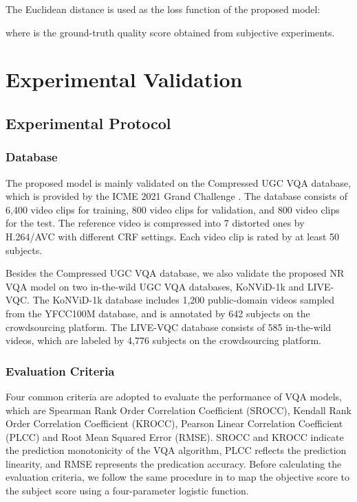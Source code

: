 \documentclass{article}
\begin{document}
The Euclidean distance is used as the loss function of the proposed model:

where  is the ground-truth quality score obtained from subjective experiments.

\section{Experimental Validation}


\subsection{Experimental Protocol}
\subsubsection{Database}
The proposed model is mainly validated on the Compressed UGC VQA database, which is provided by the ICME 2021 Grand Challenge \cite{ugc2021challenge}. The database consists of 6,400 video clips for training, 800 video clips for validation, and 800 video clips for the test. The reference video is compressed into 7 distorted ones by H.264/AVC with different CRF settings. Each video clip is rated by at least 50 subjects.


Besides the Compressed UGC VQA database, we also validate the proposed NR VQA model on two in-the-wild UGC VQA databases, KoNViD-1k\cite{hosu2017konstanz} and LIVE-VQC\cite{sinno2018large}. The KoNViD-1k database includes 1,200 public-domain videos sampled from the YFCC100M database, and is annotated by 642 subjects on the crowdsourcing platform. The LIVE-VQC database consists of 585 in-the-wild videos, which are labeled by 4,776 subjects on the crowdsourcing platform.

\subsubsection{Evaluation Criteria}
\vspace{-0.2cm}
Four common criteria are adopted to evaluate the performance of VQA models, which are Spearman Rank Order Correlation Coefficient (SROCC), Kendall Rank Order Correlation Coefficient (KROCC), Pearson Linear Correlation Coefficient (PLCC) and Root Mean Squared Error (RMSE). SROCC and KROCC indicate the prediction monotonicity of the VQA algorithm, PLCC reflects the prediction linearity, and RMSE represents the predication accuracy. Before calculating the evaluation criteria, we follow the same procedure in \cite{li2019quality} to map the objective score to the subject score using a four-parameter logistic function.
\end{document}
